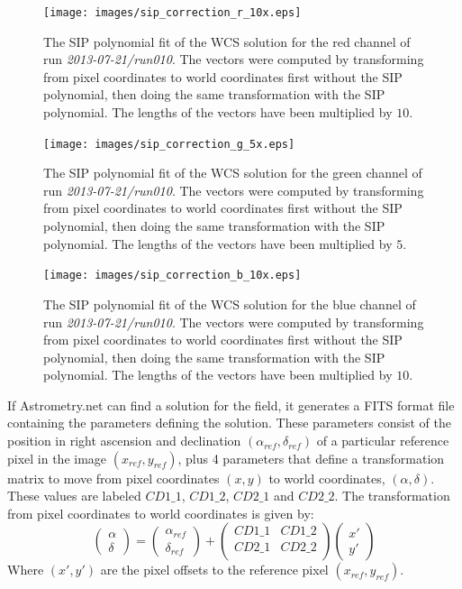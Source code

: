 \begin{figure}
  \centering
  \texttt{[image: images/sip\_correction\_r\_10x.eps]}
  \caption{The SIP polynomial fit of the WCS solution for the red channel of run \emph{2013-07-21/run010}. The vectors were computed by transforming from pixel coordinates to world coordinates first without the SIP polynomial, then doing the same transformation with the SIP polynomial. The lengths of the vectors have been multiplied by $10$.}
\label{fig:sipred}
\end{figure}

\begin{figure}
  \centering
  \texttt{[image: images/sip\_correction\_g\_5x.eps]}
  \caption{The SIP polynomial fit of the WCS solution for the green channel of run \emph{2013-07-21/run010}. The vectors were computed by transforming from pixel coordinates to world coordinates first without the SIP polynomial, then doing the same transformation with the SIP polynomial. The lengths of the vectors have been multiplied by $5$.}
\label{fig:sipgreen}
\end{figure}

\begin{figure}
  \centering
  \texttt{[image: images/sip\_correction\_b\_10x.eps]}
  \caption{The SIP polynomial fit of the WCS solution for the blue channel of run \emph{2013-07-21/run010}. The vectors were computed by transforming from pixel coordinates to world coordinates first without the SIP polynomial, then doing the same transformation with the SIP polynomial. The lengths of the vectors have been multiplied by $10$.}
\label{fig:sipblue}
\end{figure}

If Astrometry.net can find a solution for the field, it generates a FITS format file containing the parameters defining the solution. These parameters consist of the position in right ascension and declination $(\alpha_{ref}, \delta_{ref})$ of a particular reference pixel in the image $(x_{ref}, y_{ref})$, plus 4 parameters that define a transformation matrix to move from pixel coordinates $(x, y)$ to world coordinates, $(\alpha, \delta)$. These values are labeled $CD1\_1$, $CD1\_2$, $CD2\_1$ and $CD2\_2$. The transformation from pixel coordinates to world coordinates is given by: \begin{equation} 
\left(\begin{array}{c} \alpha \\ \delta \end{array} \right) = \left(\begin{array}{c} \alpha_{ref} \\ \delta_{ref} \end{array} \right) + 
\left(\begin{array}{cc}  CD1\_1 & CD1\_2 \\ CD2\_1  & CD2\_2 \\ \end{array}\right) 
\left(\begin{array}{c} x' \\ y' \end{array} \right)
\end{equation}
Where $(x', y')$ are the pixel offsets to the reference pixel $(x_{ref}, y_{ref})$.

